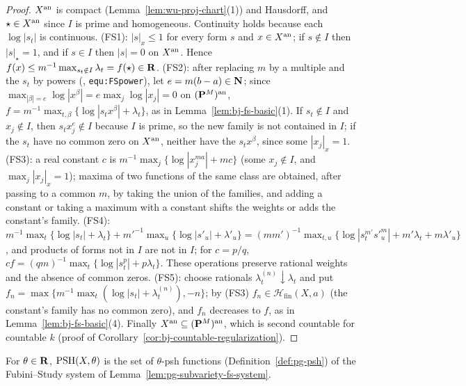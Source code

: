 \begin{proof}
$X^{\mathrm{an}}$ is compact (Lemma~\ref{lem:wu-proj-chart}(1)) and Hausdorff, and $\star\in X^{\mathrm{an}}$ since $I$ is prime and homogeneous.
Continuity holds because each $\log|s_t|$ is continuous. (FS1): $|s|_x\le1$ for every form $s$ and $x\in X^{\mathrm{an}}$; if $s\notin I$
then $|s|_\star=1$, and if $s\in I$ then $|s|=0$ on $X^{\mathrm{an}}$. Hence $f(x)\le m^{-1}\max_{s_t\notin I}\lambda_t=f(\star)\in\mathbf{R}$.
(FS2): after replacing $m$ by a multiple and the $s_t$ by powers (\cite{BJ22}, \texttt{equ:FSpower}), let
$e=m(b-a)\in\mathbf{N}$; since $\max_{|\beta|=e}\log|x^\beta|=e\max_j\log|x_j|=0$ on $(\mathbf{P}^M)^{\mathrm{an}}$,
$f=m^{-1}\max_{t,\beta}\{\log|s_tx^\beta|+\lambda_t\}$, as in Lemma~\ref{lem:bj-fs-basic}(1). If $s_t\notin I$ and $x_j\notin I$, then
$s_tx_j^e\notin I$ because $I$ is prime, so the new family is not contained in $I$; if the $s_t$ have no common zero on $X^{\mathrm{an}}$,
neither have the $s_tx^\beta$, since some $|x_j|_x=1$. (FS3): a real constant $c$ is $m^{-1}\max_j\{\log|x_j^{ma}|+mc\}$ (some
$x_j\notin I$, and $\max_j|x_j|_x=1$); maxima of two functions of the same class are obtained, after passing to a common $m$, by
taking the union of the families, and adding a constant or taking a maximum with a constant shifts the weights or adds the
constant's family. (FS4): $m^{-1}\max_t\{\log|s_t|+\lambda_t\}+m'^{-1}\max_u\{\log|s'_u|+\lambda'_u\}
=(mm')^{-1}\max_{t,u}\{\log|s_t^{m'}s'^m_u|+m'\lambda_t+m\lambda'_u\}$, and products of forms not in $I$ are not in $I$; for
$c=p/q$, $cf=(qm)^{-1}\max_t\{\log|s_t^p|+p\lambda_t\}$. These operations preserve rational weights and the absence of common zeros.
(FS5): choose rationals $\lambda_t^{(n)}\downarrow\lambda_t$ and put
$f_n=\max\{m^{-1}\max_t(\log|s_t|+\lambda_t^{(n)}),-n\}$; by (FS3) $f_n\in\mathcal H_{\mathrm{fin}}(X,a)$ (the constant's family has no
common zero), and $f_n$ decreases to $f$, as in Lemma~\ref{lem:bj-fs-basic}(4). Finally $X^{\mathrm{an}}\subseteq(\mathbf{P}^M)^{\mathrm{an}}$, which is second
countable for countable $k$ (proof of Corollary~\ref{cor:bj-countable-regularization}).
\end{proof}

\begin{definition}\label{def:pg-subvariety-psh}
\leanok
{}
For $\theta\in\mathbf{R}$, $\operatorname{PSH}(X,\theta)$ is the set of $\theta$-psh functions (Definition~\ref{def:pg-psh}) of the Fubini--Study system of
Lemma~\ref{lem:pg-subvariety-fs-system}.
\end{definition}

